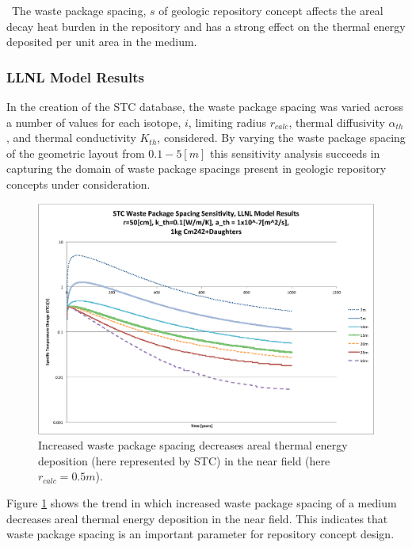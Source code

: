 \
The waste package spacing, $s$ of geologic repository concept affects the areal 
decay heat burden in the repository and has a strong effect on the thermal 
energy deposited per unit area in the medium. 

\subsubsection{LLNL Model Results}

In the creation of the \gls{STC} database, the waste package spacing was varied 
across a number of values for each isotope, $i$, limiting 
radius $r_{calc}$, thermal diffusivity $\alpha_{th}$, and thermal conductivity $K_{th}$, considered.  By 
varying the waste package spacing of the geometric layout from $0.1-5 [m]$
this sensitivity analysis succeeds in capturing the domain of 
waste package spacings present in geologic repository concepts under 
consideration. 

\begin{figure}[htbp!]
\begin{center}
\includegraphics[width=\columnwidth]{./thermal_demonstration/spacing/Cm242spacing_sens.eps}
\end{center}
\caption[$K_{th}$ Sensitivity to $s$]{Increased waste package 
spacing decreases areal thermal energy deposition 
(here represented by \gls{STC}) in the near field (here $r_{calc} = 0.5m$).}
\label{fig:Cm242spacing_sens}
\end{figure}

Figure \ref{fig:Cm242spacing_sens} shows the trend in which increased waste package spacing of a medium decreases areal thermal energy 
deposition in the near field. This indicates that waste package spacing is 
an important parameter for repository concept design.

